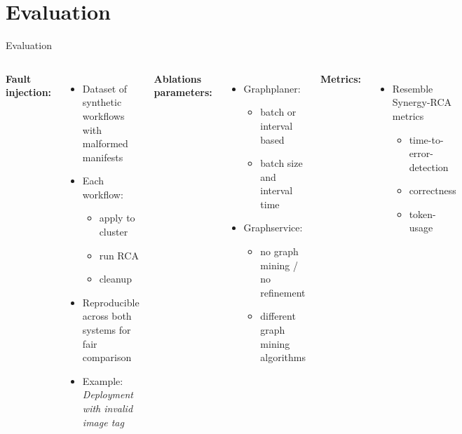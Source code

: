 \documentclass[aspectratio=169]{beamer}
\begin{document}
\section{Evaluation}
\begin{frame}[fragile]{Evaluation}

\begin{columns}
\textbf{Fault injection:}
\begin{itemize}
  \item Dataset of synthetic workflows with malformed manifests
  \item Each workflow:
  \begin{itemize}
    \item apply to cluster
    \item run RCA
    \item cleanup
  \end{itemize}
  \item Reproducible across both systems for fair comparison
  \item Example: \textit{Deployment with invalid image tag}
\end{itemize}

\textbf{Ablations parameters:}
\begin{itemize}
  \item Graphplaner:
  \begin{itemize}
    \item batch or interval based
    \item batch size and interval time
  \end{itemize}
  \item Graphservice:
  \begin{itemize}
    \item no graph mining / no refinement
    \item different graph mining algorithms
  \end{itemize}
\end{itemize}

\vspace{10pt}
\textbf{Metrics:}
\begin{itemize}
  \item Resemble Synergy-RCA metrics
  \begin{itemize}
    \item time-to-error-detection
    \item correctness
    \item token-usage
  \end{itemize}
\end{itemize}

\end{columns}


\end{frame}
\end{document}
